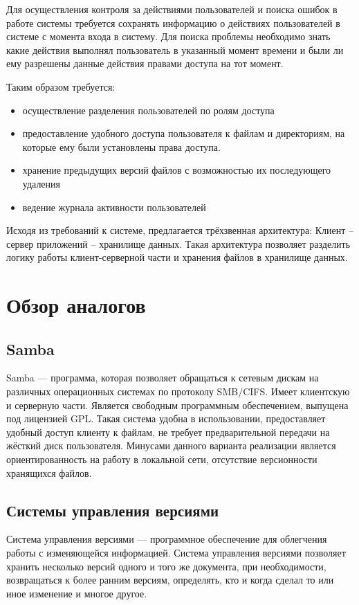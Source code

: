 \documentclass[utf8,usehyperref,12pt]{G7-32}
\begin{document}
Для осуществления контроля за действиями пользователей и поиска ошибок в работе системы требуется сохранять информацию о действиях пользователей в системе с момента входа в систему. Для поиска проблемы необходимо знать какие действия выполнял пользователь в указанный момент времени и были ли ему разрешены данные действия правами доступа на тот момент.

Таким образом требуется:
\begin{itemize}
\item осуществление разделения пользователей по ролям доступа
\item предоставление удобного доступа пользователя к файлам и директориям, на которые ему были установлены права доступа.
\item хранение предыдущих версий файлов с возможностью их последующего удаления
\item ведение журнала активности пользователей
\end{itemize}

Исходя из требований к системе, предлагается трёхзвенная архитектура: Клиент -- сервер приложений -- хранилище данных. Такая архитектура позволяет разделить логику работы клиент-серверной части и хранения файлов в хранилище данных. 

\section{Обзор аналогов}
\subsection{Samba}

Samba — программа, которая позволяет обращаться к сетевым дискам на различных операционных системах по протоколу SMB/CIFS. 
Имеет клиентскую и серверную части. Является свободным программным обеспечением, выпущена под лицензией GPL. Такая система удобна в использовании, предоставляет удобный доступ клиенту к файлам, не требует предварительной передачи на жёсткий диск пользователя. Минусами данного варианта реализации является ориентированность на работу в локальной сети, отсутствие версионности хранящихся файлов.

\subsection{Системы управления версиями}
Система управления версиями — программное обеспечение для облегчения работы с изменяющейся информацией. Система управления версиями позволяет хранить несколько версий одного и того же документа, при необходимости, возвращаться к более ранним версиям, определять, кто и когда сделал то или иное изменение и многое другое.
\end{document}
